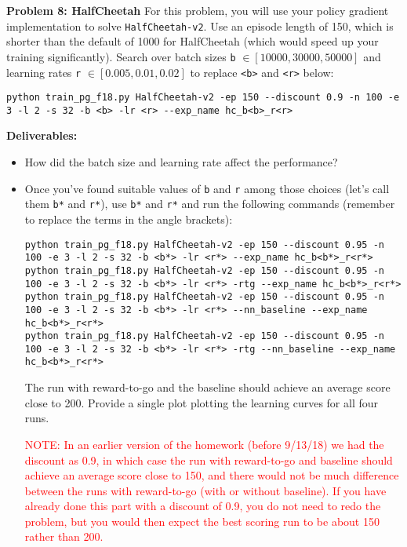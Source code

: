 \documentclass[12pt]{article}
\begin{document}
\textbf{Problem 8: HalfCheetah} For this problem, you will use your policy gradient implementation to solve \verb|HalfCheetah-v2|. 
Use an episode length of 150, which is shorter than the default of 1000 for HalfCheetah (which would speed up your training significantly).
Search over batch sizes \texttt{b} $\in [10000,30000,50000]$ and learning rates \texttt{r} $\in [0.005, 0.01, 0.02]$ to replace \texttt{<b>} and \texttt{<r>} below:
\begin{lstlisting}
python train_pg_f18.py HalfCheetah-v2 -ep 150 --discount 0.9 -n 100 -e 3 -l 2 -s 32 -b <b> -lr <r> --exp_name hc_b<b>_r<r>
\end{lstlisting}
\textbf{Deliverables:}
\begin{itemize}
    \item How did the batch size and learning rate affect the performance?
    \item Once you've found suitable values of \texttt{b} and \texttt{r} among those choices (let's call them \texttt{b*} and \texttt{r*}), use \texttt{b*} and \texttt{r*}
and run the following commands (remember to replace the terms in the angle brackets):
\begin{lstlisting}
python train_pg_f18.py HalfCheetah-v2 -ep 150 --discount 0.95 -n 100 -e 3 -l 2 -s 32 -b <b*> -lr <r*> --exp_name hc_b<b*>_r<r*>
python train_pg_f18.py HalfCheetah-v2 -ep 150 --discount 0.95 -n 100 -e 3 -l 2 -s 32 -b <b*> -lr <r*> -rtg --exp_name hc_b<b*>_r<r*>
python train_pg_f18.py HalfCheetah-v2 -ep 150 --discount 0.95 -n 100 -e 3 -l 2 -s 32 -b <b*> -lr <r*> --nn_baseline --exp_name hc_b<b*>_r<r*>
python train_pg_f18.py HalfCheetah-v2 -ep 150 --discount 0.95 -n 100 -e 3 -l 2 -s 32 -b <b*> -lr <r*> -rtg --nn_baseline --exp_name hc_b<b*>_r<r*>
\end{lstlisting}
The run with reward-to-go and the baseline should achieve an average score close to 200. Provide a single plot plotting the learning curves for all four runs.

\textcolor{red}{NOTE: In an earlier version of the homework (before 9/13/18) we had the discount as 0.9, in which case the run with reward-to-go and baseline should achieve an average score close to 150, and there would not be much difference between the runs with reward-to-go (with or without baseline). If you have already done this part with a discount of 0.9, you do not need to redo the problem, but you would then expect the best scoring run to be about 150 rather than 200.}
\end{itemize}
\end{document}
